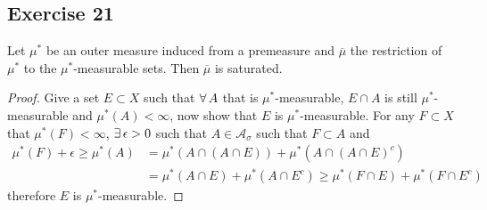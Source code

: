 \subsection*{Exercise 21}
    Let $\mu^*$ be an outer measure induced from a premeasure and $\overline{\mu}$ the restriction of $\mu^*$ to the $\mu^*$-measurable sets. Then $\overline{\mu}$ is saturated.
    \begin{proof}
        Give a set $E\subset X$ such that $\forall\, A$ that is $\mu^*$-measurable, $E\cap A$ is still $\mu^*$-measurable and $\mu^*(A)<\infty$, now show that $E$ is $\mu^*$-measurable. For any $F\subset X$ that $\mu^*(F)<\infty$, $\exists\, \epsilon>0$ such that $A\in\mathcal{A}_\sigma$ such that $F\subset A$ and 
        \begin{align*}
            \mu^*(F)+\epsilon\ge\mu^*(A)&=\mu^*(A\cap (A\cap E))+\mu^*(A\cap(A\cap E)^c)\\
            &=\mu^*(A\cap E)+\mu^*(A\cap E^c)\ge\mu^*(F\cap E)+\mu^*(F\cap E^c)
        \end{align*}
        therefore $E$ is $\mu^*$-measurable.
    \end{proof}
